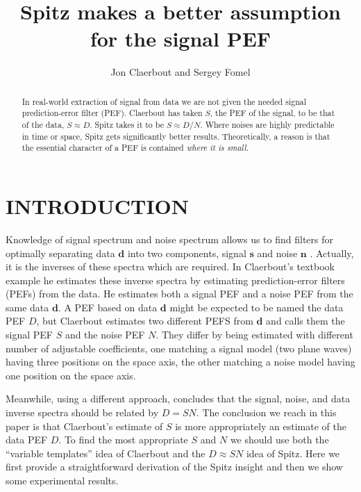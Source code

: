 

\title{Spitz makes a better assumption for the signal
  PEF}

\author{Jon Claerbout and Sergey Fomel}
\def\eq{\quad =\quad}
\maketitle

\begin{abstract}
In real-world extraction of signal from data we are not given the
needed signal prediction-error filter (PEF).  Claerbout has taken $S$,
the PEF of the signal, to be that of the data, $S\approx D$.  Spitz
takes it to be $S\approx D/N$.  Where noises are highly predictable in
time or space, Spitz gets significantly better results.
Theoretically, a reason is that the essential character of a PEF is
contained {\it where it is small.}
\end{abstract}


\section{INTRODUCTION}

Knowledge of signal spectrum and noise spectrum
allows us to find filters for optimally
separating data $\mathbf d$ into two components, signal $\mathbf s$
and noise $\mathbf n$ \cite[]{gee}.
Actually, it is the inverses of these spectra
which are required.
In Claerbout's textbook example \cite[]{gee}
he estimates these inverse spectra by estimating prediction-error filters
(PEFs) from the data.
He estimates both a signal PEF and a noise PEF from the same data $\mathbf d$.
A PEF based on data $\mathbf d$ might be expected to be named the data PEF $D$,
but Claerbout estimates two different PEFS from $\mathbf d$
and calls them the signal PEF $S$ and the noise PEF $N$.
They differ by being estimated with different number
of adjustable coefficients, one matching a signal model
(two plane waves) having three positions on the space axis,
the other matching a noise model
having one position on the space axis.
\par
Meanwhile, using a different approach,
\cite{TLE18-01-00550058} concludes
that the signal, noise, and data inverse spectra
should be related by $D=SN$.
The conclusion we reach in this paper
is that Claerbout's estimate of $S$ is more
appropriately an estimate of the data PEF $D$.
To find the most appropriate $S$ and $N$ we
should use both the ``variable templates'' idea of Claerbout
and the $D\approx SN$ idea of Spitz.
Here we first
provide a straightforward derivation of the Spitz insight
and then we show some experimental results.

